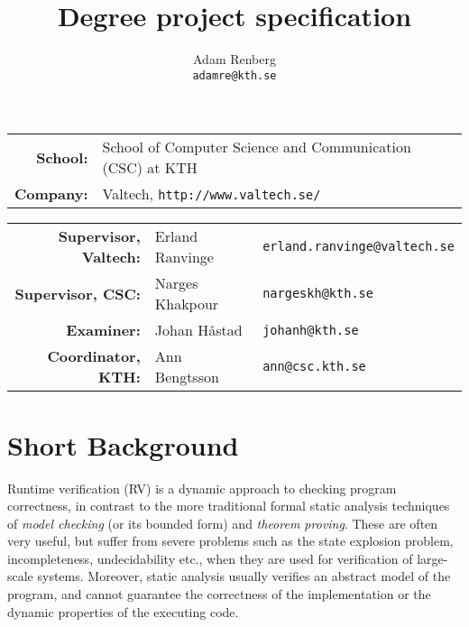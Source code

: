 \documentclass[a4paper,11pt]{article}
\begin{document}
\setlength\parindent{0em}
\setlength\parskip{1em}


\title{Degree project specification}
\author{Adam Renberg\\\texttt{adamre@kth.se}}

\maketitle

\begin{tabular}{rll}
	\textbf{School:}  & School of Computer Science and Communication (CSC) at KTH \\
    \textbf{Company:} & Valtech, \texttt{http://www.valtech.se/} \\
\end{tabular}

\begin{tabular}{rll}
	\textbf{Supervisor, Valtech:} & Erland Ranvinge & \texttt{erland.ranvinge@valtech.se} \\
    \textbf{Supervisor, CSC:}     & Narges Khakpour & \texttt{nargeskh@kth.se} \\
    \textbf{Examiner:}		  & Johan Håstad	& \texttt{johanh@kth.se} \\
    \textbf{Coordinator, KTH:}	  & Ann Bengtsson & \texttt{ann@csc.kth.se} \\
\end{tabular}


\begin{spacing}{0.9}
\setlength\parskip{0.1em}
\tableofcontents
\end{spacing}

\section{Short Background}

Runtime verification (RV) is a dynamic approach to checking program correctness, in contrast to the more 
traditional formal static analysis techniques of \emph{model checking} (or its
bounded form) and \emph{theorem proving}. These are often very useful, but suffer from severe problems such as the
state explosion problem, incompleteness, undecidability etc.,
when they are used for verification of large-scale systems.
Moreover, static analysis usually verifies an abstract model of the program, and cannot guarantee the correctness of the implementation or the dynamic properties of the executing code.
\end{document}
